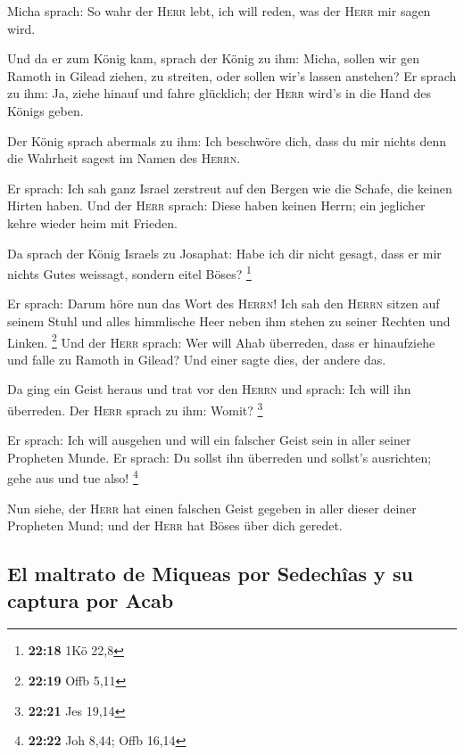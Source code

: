  Micha sprach: So wahr der \textsc{Herr} lebt, ich will
reden, was der \textsc{Herr} mir sagen wird.

 Und da er zum König kam, sprach der König zu ihm: Micha,
sollen wir gen Ramoth in Gilead ziehen, zu streiten, oder sollen wir's
lassen anstehen? Er sprach zu ihm: Ja, ziehe hinauf und fahre glücklich;
der \textsc{Herr} wird's in die Hand des Königs geben.

 Der König sprach abermals zu ihm: Ich beschwöre dich,
dass du mir nichts denn die Wahrheit sagest im Namen des \textsc{Herrn}.

 Er sprach: Ich sah ganz Israel zerstreut auf den Bergen
wie die Schafe, die keinen Hirten haben. Und der \textsc{Herr} sprach:
Diese haben keinen Herrn; ein jeglicher kehre wieder heim mit Frieden.

 Da sprach der König Israels zu Josaphat: Habe ich dir
nicht gesagt, dass er mir nichts Gutes weissagt, sondern eitel Böses?
\footnote{\textbf{22:18} 1Kö 22,8}

 Er sprach: Darum höre nun das Wort des \textsc{Herrn}!
Ich sah den \textsc{Herrn} sitzen auf seinem Stuhl und alles himmlische
Heer neben ihm stehen zu seiner Rechten und Linken. \footnote{\textbf{22:19}
  Offb 5,11}  Und der \textsc{Herr} sprach: Wer will Ahab
überreden, dass er hinaufziehe und falle zu Ramoth in Gilead? Und einer
sagte dies, der andere das.

 Da ging ein Geist heraus und trat vor den \textsc{Herrn}
und sprach: Ich will ihn überreden. Der \textsc{Herr} sprach zu ihm:
Womit? \footnote{\textbf{22:21} Jes 19,14}

 Er sprach: Ich will ausgehen und will ein falscher Geist
sein in aller seiner Propheten Munde. Er sprach: Du sollst ihn überreden
und sollst's ausrichten; gehe aus und tue also! \footnote{\textbf{22:22}
  Joh 8,44; Offb 16,14}

 Nun siehe, der \textsc{Herr} hat einen falschen Geist
gegeben in aller dieser deiner Propheten Mund; und der \textsc{Herr} hat
Böses über dich geredet.

\hypertarget{el-maltrato-de-miqueas-por-sedechuxeeas-y-su-captura-por-acab}{%
\subsection{El maltrato de Miqueas por Sedechîas y su captura por
Acab}\label{el-maltrato-de-miqueas-por-sedechuxeeas-y-su-captura-por-acab}}

